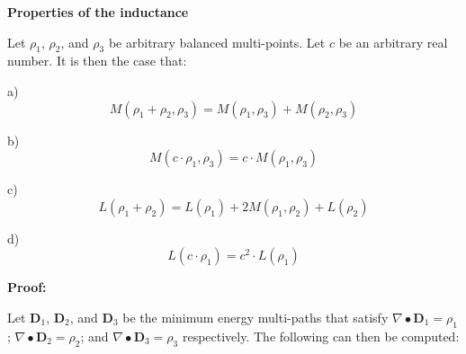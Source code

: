 \vspace{5mm}

\textbf{Properties of the inductance}

\begin{thm}\label{thm:balanced_multi-point_inductance_properties}
Let \(\rho_1\), \(\rho_2\), and \(\rho_3\) be arbitrary balanced multi-points. Let \(c\) be an arbitrary real number. It is then the case that:

a)
\[M(\rho_1 + \rho_2, \rho_3) = M(\rho_1, \rho_3) + M(\rho_2, \rho_3)\]

b)
\[M(c \cdot \rho_1, \rho_3) = c \cdot M(\rho_1, \rho_3)\]

c)
\[L(\rho_1 + \rho_2) = L(\rho_1) + 2M(\rho_1, \rho_2) + L(\rho_2)\]

d)
\[L(c \cdot \rho_1) = c^2 \cdot L(\rho_1)\]
\end{thm}
\textbf{Proof:}

Let \(\mathbf{D}_1\), \(\mathbf{D}_2\), and \(\mathbf{D}_3\) be the minimum energy multi-paths that satisfy \(\nabla \bullet \mathbf{D}_1 = \rho_1\); \(\nabla \bullet \mathbf{D}_2 = \rho_2\); and \(\nabla \bullet \mathbf{D}_3 = \rho_3\) respectively. The following can then be computed:

